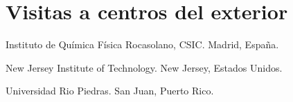 \section{Visitas a centros del exterior}

 Instituto de Química Física Rocasolano, CSIC. Madrid, España. 

 New Jersey Institute of Technology. New Jersey, Estados Unidos.

 Universidad Rio Piedras. San Juan, Puerto Rico.
